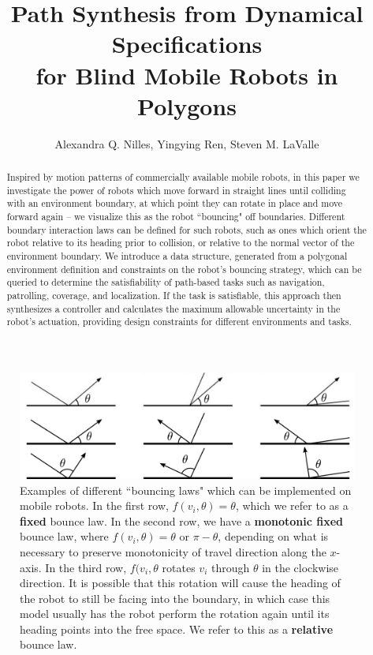 \documentclass[]{article}  %
\title{Path Synthesis from Dynamical Specifications \\ for Blind Mobile Robots in Polygons}
\author{Alexandra Q. Nilles, Yingying Ren, Steven M. LaValle%
}
\begin{document}
\maketitle

\begin{abstract}
Inspired by motion patterns of commercially available mobile robots, in this
paper we investigate the power of robots which move forward in straight lines
until colliding with an environment boundary, at which point they can rotate in
place and move forward again -- we visualize this as the robot ``bouncing" off
boundaries. Different boundary interaction laws can be
defined for such robots, such as ones which orient the robot relative to its
heading prior to collision, or relative to the normal vector of the environment
boundary. We introduce a data structure, generated from a polygonal environment
 definition and constraints on the robot's bouncing strategy, which can be
queried to determine the satisfiability of path-based tasks such as navigation,
patrolling, coverage, and localization. If the task is satisfiable, this
approach then synthesizes a controller and calculates the maximum allowable 
uncertainty in the robot's actuation, providing design constraints for different 
environments and tasks.
\end{abstract}


\begin{figure}
    \includegraphics[width=0.8\linewidth]{figures/bounce_examples.pdf}
    \centering
    \caption[test]{\label{fig:bex}Examples of different ``bouncing laws" which can be implemented on
mobile robots. In the first row, $f(v_i, \theta) = \theta$, which we refer to
as a \textbf{fixed} bounce law. In the second row, we have a \textbf{monotonic
fixed} bounce law, where
$f(v_i, \theta) = \theta$ or $\pi-\theta$, depending on what is necessary to
preserve monotonicity of travel direction along the $x$-axis. In the third
row, $f(v_i, \theta$ rotates $v_i$ through $\theta$ in the clockwise
direction. It is possible that this rotation will cause the 
heading of the robot to still be facing into the boundary, in which case this model usually has the robot 
perform the rotation again until its heading points into the free space. We
refer to this as a \textbf{relative} bounce law.
}
\end{figure}
\end{document}
